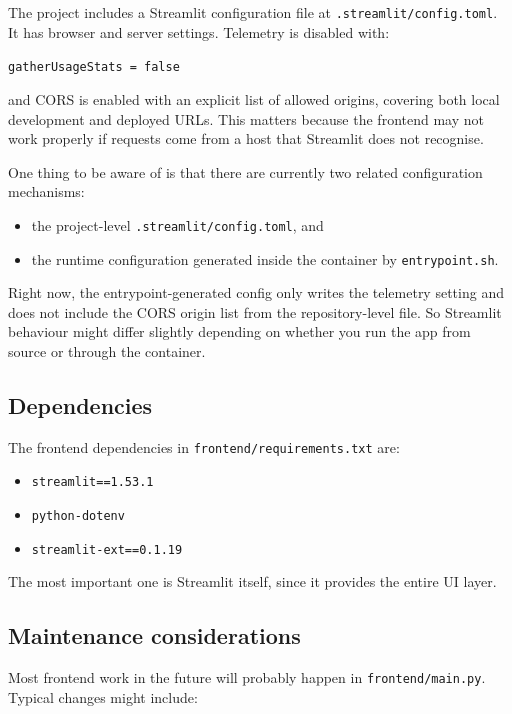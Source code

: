 \documentclass{article}
\begin{document}
The project includes a Streamlit configuration file at \texttt{.streamlit/config.toml}. It has browser and server settings. Telemetry is disabled with:

\begin{center}
\texttt{gatherUsageStats = false}
\end{center}

and CORS is enabled with an explicit list of allowed origins, covering both local development and deployed URLs. This matters because the frontend may not work properly if requests come from a host that Streamlit does not recognise.

One thing to be aware of is that there are currently two related configuration mechanisms:

\begin{itemize}
    \item the project-level \texttt{.streamlit/config.toml}, and
    \item the runtime configuration generated inside the container by \texttt{entrypoint.sh}.
\end{itemize}

Right now, the entrypoint-generated config only writes the telemetry setting and does not include the CORS origin list from the repository-level file. So Streamlit behaviour might differ slightly depending on whether you run the app from source or through the container.

\subsection{Dependencies}

The frontend dependencies in \texttt{frontend/requirements.txt} are:

\begin{itemize}
    \item \texttt{streamlit==1.53.1}
    \item \texttt{python-dotenv}
    \item \texttt{streamlit-ext==0.1.19}
\end{itemize}

The most important one is Streamlit itself, since it provides the entire UI layer.

\subsection{Maintenance considerations}

Most frontend work in the future will probably happen in \texttt{frontend/main.py}. Typical changes might include:
\end{document}
